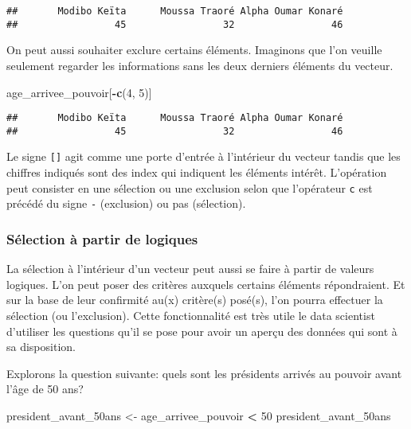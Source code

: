 \documentclass[]{book}
\newenvironment{Shaded}{\begin{snugshade}}{\end{snugshade}}
\newcommand{\KeywordTok}[1]{\textcolor[rgb]{0.13,0.29,0.53}{\textbf{#1}}}
\newcommand{\DecValTok}[1]{\textcolor[rgb]{0.00,0.00,0.81}{#1}}
\newcommand{\StringTok}[1]{\textcolor[rgb]{0.31,0.60,0.02}{#1}}
\newcommand{\OperatorTok}[1]{\textcolor[rgb]{0.81,0.36,0.00}{\textbf{#1}}}
\newcommand{\NormalTok}[1]{#1}
\begin{document}
\begin{verbatim}
##       Modibo Keïta      Moussa Traoré Alpha Oumar Konaré 
##                 45                 32                 46
\end{verbatim}

On peut aussi souhaiter exclure certains éléments. Imaginons que l'on
veuille seulement regarder les informations sans les deux derniers
éléments du vecteur.

\begin{Shaded}
\begin{Highlighting}[]
\NormalTok{age_arrivee_pouvoir[}\OperatorTok{-}\KeywordTok{c}\NormalTok{(}\DecValTok{4}\NormalTok{, }\DecValTok{5}\NormalTok{)]}
\end{Highlighting}
\end{Shaded}

\begin{verbatim}
##       Modibo Keïta      Moussa Traoré Alpha Oumar Konaré 
##                 45                 32                 46
\end{verbatim}

Le signe \texttt{{[}{]}} agit comme une porte d'entrée à l'intérieur du
vecteur tandis que les chiffres indiqués sont des index qui indiquent
les éléments intérêt. L'opération peut consister en une sélection ou une
exclusion selon que l'opérateur \texttt{c} est précédé du signe
\texttt{-} (exclusion) ou pas (sélection).

\subsubsection{Sélection à partir de
logiques}\label{selection-a-partir-de-logiques}

La sélection à l'intérieur d'un vecteur peut aussi se faire à partir de
valeurs logiques. L'on peut poser des critères auxquels certains
éléments répondraient. Et sur la base de leur confirmité au(x)
critère(s) posé(s), l'on pourra effectuer la sélection (ou l'exclusion).
Cette fonctionnalité est très utile le data scientist d'utiliser les
questions qu'il se pose pour avoir un aperçu des données qui sont à sa
disposition.

Explorons la question suivante: quels sont les présidents arrivés au
pouvoir avant l'âge de 50 ans?

\begin{Shaded}
\begin{Highlighting}[]
\NormalTok{president_avant_50ans <-}\StringTok{ }\NormalTok{age_arrivee_pouvoir }\OperatorTok{<}\StringTok{ }\DecValTok{50}
\NormalTok{president_avant_50ans}
\end{Highlighting}
\end{Shaded}
\end{document}
